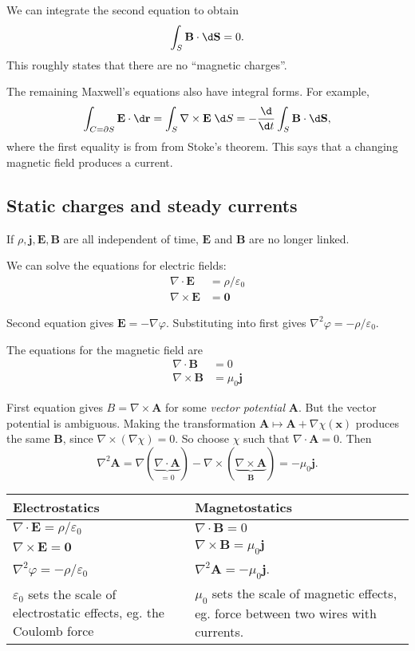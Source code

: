 \documentclass[a4paper]{article}
\begin{document}
We can integrate the second equation to obtain
\[
  \int_S \mathbf{B}\cdot \d \mathbf{S} = 0.
\]
This roughly states that there are no ``magnetic charges''.

The remaining Maxwell's equations also have integral forms. For example,
\[
  \int_{C = \partial S} \mathbf{E}\cdot \d \mathbf{r} = \int_S \nabla \times \mathbf{E}\;\d S = -\frac{\d }{\d t}\int_S \mathbf{B}\cdot \d \mathbf{S},
\]
where the first equality is from from Stoke's theorem. This says that a changing magnetic field produces a current.

\subsection{Static charges and steady currents}
If $\rho, \mathbf{j}, \mathbf{E}, \mathbf{B}$ are all independent of time, $\mathbf{E}$ and $\mathbf{B}$ are no longer linked.

We can solve the equations for electric fields:
\begin{align*}
  \nabla\cdot \mathbf{E} &= \rho/\varepsilon_0\\
  \nabla\times \mathbf{E} &= \mathbf{0}
\end{align*}

Second equation gives $\mathbf{E} = -\nabla \varphi$. Substituting into first gives $\nabla^2 \varphi = -\rho/\varepsilon_0$.

The equations for the magnetic field are 
\begin{align*}
  \nabla\cdot \mathbf{B} &= 0\\
  \nabla\times \mathbf{B} &= \mu_0 \mathbf{j}
\end{align*}

First equation gives $B = \nabla \times \mathbf{A}$ for some \emph{vector potential} $\mathbf{A}$. But the vector potential is ambiguous. Making the transformation $\mathbf{A}\mapsto \mathbf{A} + \nabla \chi(\mathbf{x})$ produces the same $\mathbf{B}$, since $\nabla\times (\nabla \chi) = 0$. So choose $\chi$ such that $\nabla\cdot \mathbf{A} = 0$. Then 
\[
  \nabla^2 \mathbf{A} = \nabla(\underbrace{\nabla\cdot \mathbf{A}}_{=0}) - \nabla\times (\underbrace{\nabla\times \mathbf{A}}_{\mathbf{B}}) = -\mu_0 \mathbf{j}.
\]
\noindent\begin{tabularx}{\textwidth}{XX}
  \toprule
  Electrostatics & Magnetostatics\\
  \midrule
  $\nabla\cdot \mathbf{E} = \rho/\varepsilon_0$ & $\nabla\cdot \mathbf{B} = 0$\\
  $\nabla\times \mathbf{E} = \mathbf{0}$ & $\nabla\times \mathbf{B} = \mu_0 \mathbf{j}$\\
  $\nabla^2 \varphi = -\rho/\varepsilon_0$ & $\nabla^2 \mathbf{A} = -\mu_0 \mathbf{j}$.\\
  $\varepsilon_0$ sets the scale of electrostatic effects, eg. the Coulomb force & $\mu_0$ sets the scale of magnetic effects, eg. force between two wires with currents.\\
  \bottomrule
\end{tabularx}
\end{document}
